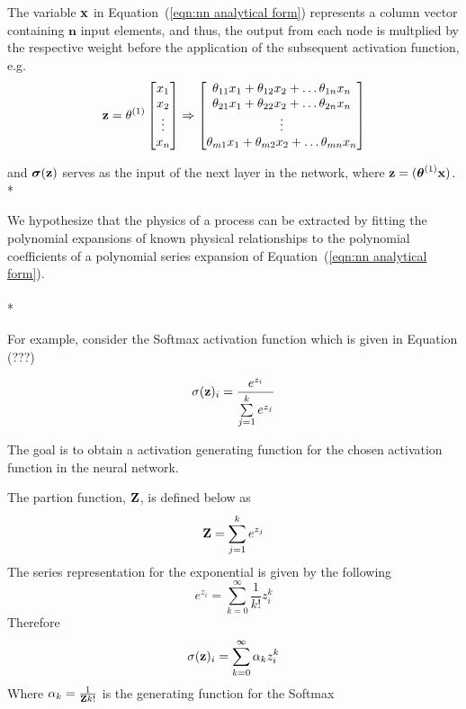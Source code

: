 The variable $\bold x$ in Equation~(\ref{eqn:nn analytical form}) represents a column vector containing $\boldsymbol n$ input elements, and thus, the output from each node is multplied by the respective weight before the application of the subsequent activation function, e.g.
\begin{equation}
	\bold z =
	\theta^{(1)} \begin{bmatrix}
				x_{1} \\
				x_{2} \\
				\vdots \\
				x_{n}
			\end{bmatrix}
	\Rightarrow \begin{bmatrix}
					\theta_{11} x_{1} + \theta_{12} x_{2} + \ldots \theta_{1n} x_{n} \\
					\theta_{21} x_{1} + \theta_{22} x_{2} + \ldots \theta_{2n} x_{n} \\
					\vdots \\
					\theta_{m1} x_{1} + \theta_{m2} x_{2} + \ldots \theta_{mn} x_{n} \\
				\end{bmatrix}
\end{equation}

and $\boldsymbol\sigma (\bold z)$ serves as the input of the next layer in the network, where $\bold z = (\boldsymbol\theta^{(1)} \bold x)$. \\*

We hypothesize that the physics of a process can be extracted by fitting the polynomial expansions of known physical relationships to the polynomial coefficients of a polynomial series expansion of Equation~(\ref{eqn:nn analytical form}). \\
\\*



For example, consider the Softmax activation function which is given in Equation (???)

\begin{equation}
	\sigma(\bold z)_i =
	\frac{e^{z_i}}{\sum\limits_{j=1}^k e^{z_j}}
\end{equation}

The goal is to obtain a activation generating function for the chosen activation function in the neural network.

The partion function, $\bold Z$, is defined below as
\begin{equation}
	\bold Z = \sum\limits_{j=1}^k e^{z_j}
\end{equation}
The series representation for the exponential is given by the following
\begin{equation}
	e^{z_{i}} = \sum_{k=0}^{\infty}\frac{1}{k!} z_{i}^{k}
\end{equation}
Therefore
\begin{equation}
	\sigma(\bold z)_i =
	\sum\limits_{k=0}^{\infty} \alpha_{k}z_{i}^{k}
\end{equation}
Where $\alpha_k = \frac{1}{{\bold Z}k!}$ is the generating function for the Softmax


